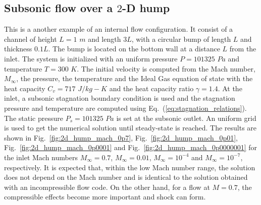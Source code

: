 \documentclass[preprint,10pt]{elsarticle}
\newcommand{\eqt}[1]{Eq.~(\ref{#1})}                     %
\newcommand{\fig}[1]{Fig.~\ref{#1}}                      %
\begin{document}
\subsection{Subsonic flow over a $2$-D hump} \label{sec:hump}
This is a another example of an internal flow configuration. It consist of a channel of height $L=1$ $m$ and length $3L$, with a circular bump of length $L$ and thickness $0.1L$. The bump is located on the bottom wall at a distance $L$ from the inlet. The system is initialized with an uniform pressure $P=101325$ $Pa$ and temperature $T=300$ $K$. The initial velocity is computed from the Mach number, $M_\infty$, the pressure, the temperature and the Ideal Gas equation of state with the heat capacity $C_v = 717$ $J/kg-K$ and the heat capacity ratio $\gamma=1.4$. At the inlet, a subsonic stagnation boundary condition is used and the stagnation pressure and temperature are computed using \eqt{eq:stagnation_relations}.
The static pressure $P_s = 101325$ $Pa$ is set at the subsonic outlet. An uniform grid is used to get the numerical solution until steady-state is reached. The results are shown in \fig{fig:2d_hump_mach_0p7}, \fig{fig:2d_hump_mach_0p01}, \fig{fig:2d_hump_mach_0p0001} and \fig{fig:2d_hump_mach_0p0000001} for the inlet Mach numbers $M_\infty=0.7$, $M_\infty=0.01$, $M_\infty=10^{-4}$ and $M_\infty=10^{-7}$, respectively. It is expected that, within the low Mach number range, the solution does not depend on the Mach number and is identical to the solution obtained with an incompressible flow code. On the other hand, for a flow at $M=0.7$, the compressible effects become more important and shock can form.
\end{document}
